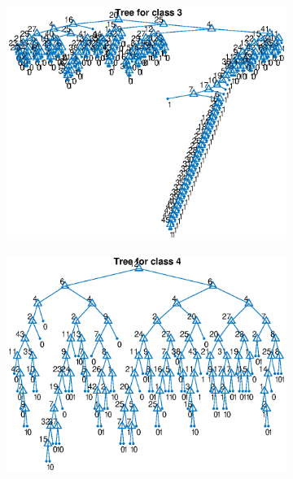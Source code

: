 \documentclass{article}
\begin{document}
\begin{figure}
\begin{subfigure}[b]{.49\textwidth}
   \includegraphics[width=\textwidth]{noisytree3.eps}
 \end{subfigure}
 \begin{subfigure}[b]{.49\textwidth}
   \includegraphics[width=\textwidth]{noisytree4.eps}
 \end{subfigure}
 \begin{subfigure}[b]{.49\textwidth}

\end{subfigure}
\end{figure}
\end{document}
